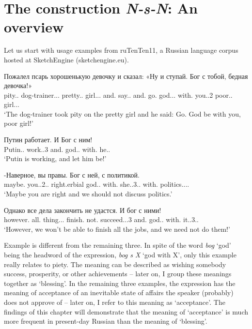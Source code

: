 \documentclass[output=paper]{langscibook}
\begin{document}
\section{The construction \textit{N-s-N}: An overview}

Let us start with usage examples from ruTenTen11, a Russian language corpus hosted at SketchEngine (sketchengine.eu).


\ea\label{ex:mikhailov:3}
\ea\label{ex:mikhailov:3a}
\gll  Пожалел псарь хорошенькую девочку и сказал: «Ну и ступай. Бог с тобой, бедная девочка!»\\
     pity.{\PAST}.{\glossM}{\SG} dog{}-trainer.{\NOUN}.{\NOM}.{\SG} pretty.{\ADJ}.{\ACC} girl.{\NOUN}.{\ACC}.{\SG} and.{\CONJ} say.{\PAST}.{\PTCP} and.{\PTCP} go.{\IMP} god.{\NOUN}.{\NOM}.{\SG} with.{\PREP} you.{\PRON}.2 poor.{\ADJ}.{\NOM}{\F}{\SG} girl.{\NOUN}.{\NOM}.{\SG}\\
\glt `The dog-trainer took pity on the pretty girl and he said: Go. God be with you, poor girl!'

\ex
\gll Путин работает. И Бог с ним!\\
     Putin.{\NOUNPROPER}.{\NOM} work.{\PRES}.3{\SG} and.{\PTCP} god.{\NOUN}.{\NOM} with.{\PREP} he.{\PRON}.{\INSTR}\\
\glt `Putin is working, and let him be!'

\ex
\gll
    -Наверное, вы правы. Бог с ней, с политикой.\\
     maybe.{\ADV} you.{\PRON}.2.{\NOM}.{\PL} right.{\ADV}erbial god.{\NOUN}.{\NOM} with.{\PREP} she.{\PRON}.3{\F}.{\INSTR}.{\SG} with.{\PREP} politics.{\NOUN}.{\F}.{\INSTR}.{\SG}\\
\glt `Maybe you are right and we should not discuss politics.'


\ex
\gll  Однако все дела закончить не удастся. И бог с ними!\\
     however.{\ADV} all.{\PRON} thing.{\NOUN}.{\PL}.{\ACC} finish.{\INF} not.{\PTCP} succeed.{\REFL}.{\FUT}.3{\SG} and.{\PTCP} god.{\NOUN}.{\NOM} with.{\PREP} it.{\PRON}.3.{\PL}.{\INSTR}\\
\glt `However, we won’t be able to finish all the jobs, and we need not do them!'
\z
\z

Example  is different from the remaining three. In spite of the word \textit{bog} ‘god’ being the headword of the expression, \textit{bog s X} ‘god with X’, only this example really relates to piety. The meaning can be described as wishing somebody success, prosperity, or other achievements – later on, I group these meanings together as ‘blessing’. In the remaining three examples, the expression has the meaning of acceptance of an inevitable state of affairs the speaker (probably) does not approve of – later on, I refer to this meaning as ‘acceptance’. The findings of this chapter will demonstrate that the meaning of ‘acceptance’ is much more frequent in present-day Russian than the meaning of ‘blessing’.
\end{document}
